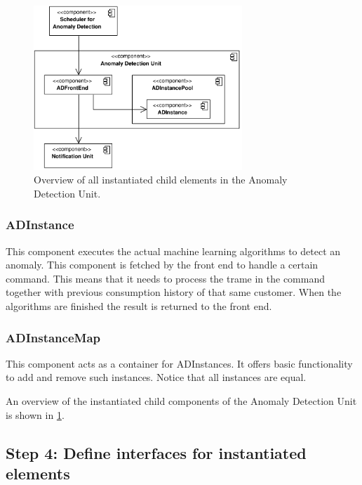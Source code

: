 \begin{figure}[H]
	\begin{centering}
		\includegraphics[width=0.7\textwidth]{figs/add-it6-elements.pdf}
		\caption{Overview of all instantiated child elements in the Anomaly
		Detection Unit.}
		\label{fig:it6/elements}
	\end{centering}
\end{figure}

\subsubsection{ADInstance}

\npar This component executes the actual machine learning algorithms to detect
an anomaly. This component is fetched by the front end to handle a certain
command. This means that it needs to process the trame in the command together
with previous consumption history of that same customer. When the algorithms are
finished the result is returned to the front end.

\subsubsection{ADInstanceMap}

\npar This component acts as a container for ADInstances. It offers basic
functionality to add and remove such instances. Notice that all instances
are equal.


\npar An overview of the instantiated child components of the Anomaly Detection
Unit is shown in \ref{fig:it6/elements}.


\subsection{Step 4: Define interfaces for instantiated elements}
\label{add:it6/interfaces}


